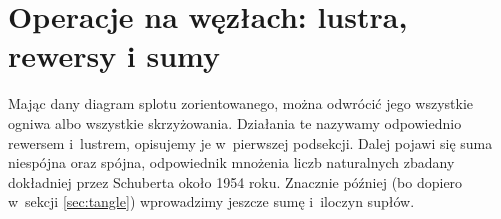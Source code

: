 
\section{Operacje na węzłach: lustra, rewersy i sumy}
Mając dany diagram splotu zorientowanego, można odwrócić jego wszystkie ogniwa albo wszystkie skrzyżowania.
Działania te nazywamy odpowiednio rewersem i~lustrem, opisujemy je w~pierwszej podsekcji.
Dalej pojawi się suma niespójna oraz spójna, odpowiednik mnożenia liczb naturalnych zbadany dokładniej przez Schuberta około 1954 roku.
%
Znacznie później (bo dopiero w~sekcji \ref{sec:tangle}) wprowadzimy jeszcze sumę i~iloczyn supłów.







